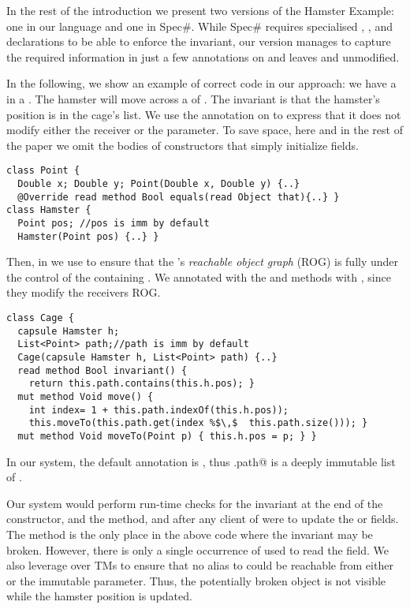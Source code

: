 In the rest of the introduction we present two versions of the Hamster Example: one in our language and one in Spec\#. While Spec\# requires specialised \Q@Point@, \Q@Hamster@, and \Q@Cage@ declarations to be able to enforce the invariant, our version manages to capture the required information in just a few annotations on \Q@Cage@ and leaves \Q@Point@ and \Q@Hamster@ unmodified.

In the following, we show an example of correct code in our approach: we have a \Q@Hamster@ in a \Q@Cage@.
The hamster will move across a \Q@List@ of \Q@Point@s.
The invariant is that the hamster's position is in the cage's list.
We use the \Q@read@ annotation on \Q@equals@ to express that it does not modify either the
receiver or the parameter.
To save space, here and in the rest of the paper we omit the bodies of constructors that simply initialize fields.
\begin{lstlisting}
class Point {
  Double x; Double y; Point(Double x, Double y) {..}
  @Override read method Bool equals(read Object that){..} }
class Hamster {
  Point pos; //pos is imm by default
  Hamster(Point pos) {..} }
\end{lstlisting}
Then, in \Q@Cage@
we use \Q@capsule@ to ensure
that the \Q@Hamster@'s \emph{reachable object graph} (ROG) is fully under the control
of the containing \Q@Cage@.
We annotated with the \Q@move@
and \Q@moveTo@ methods with \Q@mut@, since they modify
the receivers ROG.
\begin{lstlisting}
class Cage {
  capsule Hamster h;
  List<Point> path;//path is imm by default
  Cage(capsule Hamster h, List<Point> path) {..}
  read method Bool invariant() {
    return this.path.contains(this.h.pos); }
  mut method Void move() {
    int index= 1 + this.path.indexOf(this.h.pos));
    this.moveTo(this.path.get(index %$\,$  this.path.size())); }
  mut method Void moveTo(Point p) { this.h.pos = p; } }
\end{lstlisting}
In our system, the default annotation is \Q@imm@, thus \Q@Cage.path@ is a deeply immutable list of \Q@Point@s.

Our system would perform run-time checks for the invariant
at the end of the constructor, and the \Q@moveTo@
method, and after any client of \Q@Cage@
were to update the \Q@h@ or \Q@path@ fields.
The \Q@moveTo@ method is the only place in the above code where the invariant may be broken. However, there is only a single occurrence of \Q@this@ used to read the \Q@h@ field. We also leverage over TMs to ensure that no alias to \Q@this@ could be reachable from either \Q@h@ or the immutable \Q@Point@ parameter. Thus, the potentially broken \Q@this@ object is not visible while the hamster position is updated. 

